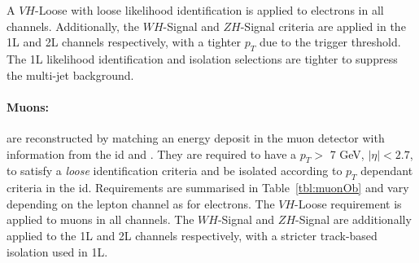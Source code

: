 A $VH$-Loose with loose likelihood identification is applied to electrons in all channels. Additionally, the $WH$-Signal and $ZH$-Signal criteria are applied in the 1L and 2L channels respectively, with a tighter $p_T$ due to the trigger threshold. The 1L likelihood identification and isolation selections are tighter to suppress the multi-jet background.

\paragraph{Muons:} are reconstructed by matching an energy deposit in the muon detector with information from the \gls{id} and  \cite{Aad:2746302}. They are required to have a $p_T >$ 7 GeV, $|\eta| < 2.7$, to satisfy a \textit{loose} identification criteria and be isolated according to $p_T$ dependant criteria in the \gls{id}. Requirements are summarised in Table~\ref{tbl:muonOb} and vary depending on the lepton channel as for electrons. The $VH$-Loose requirement is applied to muons in all channels. The $WH$-Signal and $ZH$-Signal are additionally applied to the 1L and 2L channels respectively, with a stricter track-based isolation used in 1L.

\begin{table}[!htbp]
    \begin{center}
      \caption{Muon Selection requirements.} %
      \label{tbl:muonOb}
    \end{center}
  \end{table}
  
